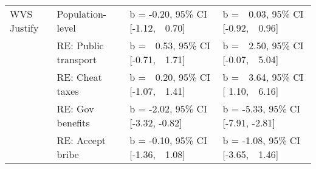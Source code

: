 \documentclass[
  man,floatsintext]{apa6}
\newenvironment{lltable}{\begin{landscape}\centering\begin{ThreePartTable}}{\end{ThreePartTable}\end{landscape}}
\begin{document}
\begin{lltable}
\begin{longtable}{llll}
WVS Justify & Population-level & b = -0.20, 95\% CI [-1.12,\ \ 0.70] & b =\ \ 0.03, 95\% CI [-0.92,\ \ 0.96]\\
 & RE: Public transport & b =\ \ 0.53, 95\% CI [-0.71,\ \ 1.71] & b =\ \ 2.50, 95\% CI [-0.07,\ \ 5.04]\\
 & RE: Cheat taxes & b =\ \ 0.20, 95\% CI [-1.07,\ \ 1.41] & b =\ \ 3.64, 95\% CI [ 1.10,\ \ 6.16]\\
 & RE: Gov benefits & b = -2.02, 95\% CI [-3.32, -0.82] & b = -5.33, 95\% CI [-7.91, -2.81]\\
 & RE: Accept bribe & b = -0.10, 95\% CI [-1.36,\ \ 1.08] & b = -1.08, 95\% CI [-3.65,\ \ 1.46]\\
\bottomrule
\end{longtable}

\end{lltable}

\newpage
\end{document}
